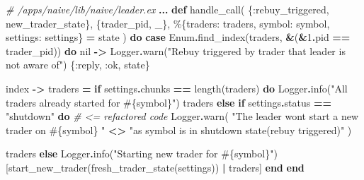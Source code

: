 \documentclass[
]{book}
\newenvironment{Shaded}{\begin{snugshade}}{\end{snugshade}}
\newcommand{\CommentTok}[1]{\textcolor[rgb]{0.56,0.35,0.01}{\textit{#1}}}
\newcommand{\ConstantTok}[1]{\textcolor[rgb]{0.00,0.00,0.00}{#1}}
\newcommand{\ControlFlowTok}[1]{\textcolor[rgb]{0.13,0.29,0.53}{\textbf{#1}}}
\newcommand{\DecValTok}[1]{\textcolor[rgb]{0.00,0.00,0.81}{#1}}
\newcommand{\KeywordTok}[1]{\textcolor[rgb]{0.13,0.29,0.53}{\textbf{#1}}}
\newcommand{\NormalTok}[1]{#1}
\newcommand{\OperatorTok}[1]{\textcolor[rgb]{0.81,0.36,0.00}{\textbf{#1}}}
\newcommand{\OtherTok}[1]{\textcolor[rgb]{0.56,0.35,0.01}{#1}}
\newcommand{\StringTok}[1]{\textcolor[rgb]{0.31,0.60,0.02}{#1}}
\newcommand{\VariableTok}[1]{\textcolor[rgb]{0.00,0.00,0.00}{#1}}
\begin{document}
\begin{Shaded}
\begin{Highlighting}[]
\CommentTok{\# /apps/naive/lib/naive/leader.ex}
  \OperatorTok{...}
  \KeywordTok{def}\NormalTok{ handle\_call(}
\NormalTok{        \{}\VariableTok{:rebuy\_triggered}\NormalTok{, new\_trader\_state\},}
\NormalTok{        \{trader\_pid, \_\},}
\NormalTok{        \%\{}\VariableTok{traders:}\NormalTok{ traders, }\VariableTok{symbol:}\NormalTok{ symbol, }\VariableTok{settings:}\NormalTok{ settings\} }\OperatorTok{=}\NormalTok{ state}
\NormalTok{      ) }\KeywordTok{do}
    \KeywordTok{case} \ConstantTok{Enum}\OperatorTok{.}\NormalTok{find\_index(traders, }\OperatorTok{\&}\NormalTok{(}\OperatorTok{\&}\DecValTok{1}\OperatorTok{.}\NormalTok{pid }\OperatorTok{==}\NormalTok{ trader\_pid)) }\KeywordTok{do}
      \ConstantTok{nil} \OperatorTok{{-}\textgreater{}}
        \ConstantTok{Logger}\OperatorTok{.}\NormalTok{warn(}\StringTok{"Rebuy triggered by trader that leader is not aware of"}\NormalTok{)}
\NormalTok{        \{}\VariableTok{:reply}\NormalTok{, }\VariableTok{:ok}\NormalTok{, state\}}

\NormalTok{      index }\OperatorTok{{-}\textgreater{}}
\NormalTok{        traders }\OperatorTok{=}
          \ControlFlowTok{if}\NormalTok{ settings}\OperatorTok{.}\NormalTok{chunks }\OperatorTok{==}\NormalTok{ length(traders) }\KeywordTok{do}
            \ConstantTok{Logger}\OperatorTok{.}\NormalTok{info(}\StringTok{"All traders already started for }\OtherTok{\#\{}\NormalTok{symbol}\OtherTok{\}}\StringTok{"}\NormalTok{)}
\NormalTok{            traders}
          \ControlFlowTok{else}
            \ControlFlowTok{if}\NormalTok{ settings}\OperatorTok{.}\NormalTok{status }\OperatorTok{==} \StringTok{"shutdown"} \KeywordTok{do} \CommentTok{\# \textless{}= refactored code}
              \ConstantTok{Logger}\OperatorTok{.}\NormalTok{warn(}
                \StringTok{"The leader won\textquotesingle{}t start a new trader on }\OtherTok{\#\{}\NormalTok{symbol}\OtherTok{\}}\StringTok{ "} \OperatorTok{\textless{}\textgreater{}}
                  \StringTok{"as symbol is in shutdown state(rebuy triggered)"}
\NormalTok{              )}

\NormalTok{              traders}
            \ControlFlowTok{else}
              \ConstantTok{Logger}\OperatorTok{.}\NormalTok{info(}\StringTok{"Starting new trader for }\OtherTok{\#\{}\NormalTok{symbol}\OtherTok{\}}\StringTok{"}\NormalTok{)}
\NormalTok{              [start\_new\_trader(fresh\_trader\_state(settings)) }\OperatorTok{|}\NormalTok{ traders]}
            \KeywordTok{end}
          \KeywordTok{end}


\end{Highlighting}
\end{Shaded}
\end{document}
